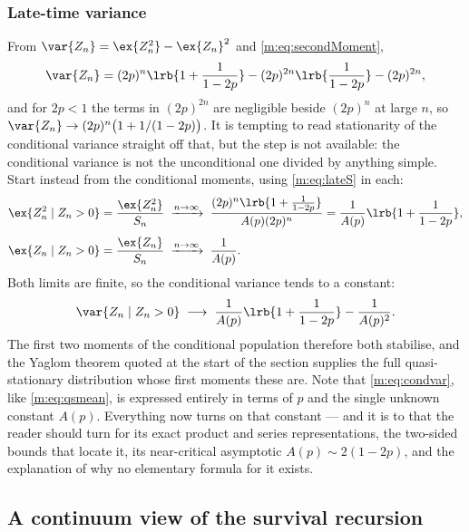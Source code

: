 \subsubsection{Late-time variance}

From $\var{Z_n} = \ex{Z_n^2}-\ex{Z_n}^2$ and \cref{m:eq:secondMoment},
\begin{equation*}
\var{Z_n} = (2p)^n\lrb{1+\frac{1}{1-2p}} - (2p)^{2n}\lrb{\frac{1}{1-2p}} - (2p)^{2n},
\end{equation*}
and for $2p<1$ the terms in $(2p)^{2n}$ are negligible beside $(2p)^n$ at large
$n$, so $\var{Z_n}\to(2p)^n\bigl(1+1/(1-2p)\bigr)$. It is tempting to read
stationarity of the conditional variance straight off that, but the step is not
available: the conditional variance is not the unconditional one divided by
anything simple. Start instead from the conditional moments, using
\cref{m:eq:lateS} in each:
\begin{align*}
\ex{Z_n^2\mid Z_n>0} &= \frac{\ex{Z_n^2}}{S_n}
\;\xrightarrow{n\to\infty}\;
\frac{(2p)^n\lrb{1+\frac{1}{1-2p}}}{A(p)(2p)^n}
= \frac{1}{A(p)}\lrb{1+\frac{1}{1-2p}},\\[4pt]
\ex{Z_n\mid Z_n>0} &= \frac{\ex{Z_n}}{S_n}
\;\xrightarrow{n\to\infty}\;
\frac{1}{A(p)} .
\end{align*}
Both limits are finite, so the conditional variance tends to a constant:
\begin{equation}
\label{m:eq:condvar}
\var{Z_n\mid Z_n>0} \;\longrightarrow\;
\frac{1}{A(p)}\lrb{1+\frac{1}{1-2p}} - \frac{1}{A(p)^2} .
\end{equation}
The first two moments of the conditional population therefore both stabilise, and
the Yaglom theorem quoted at the start of the section supplies the full
quasi-stationary distribution whose first moments these are. Note that
\cref{m:eq:condvar}, like \cref{m:eq:qsmean}, is expressed entirely in terms of $p$
and the single unknown constant $A(p)$. Everything now turns on that constant ---
and it is to \ChA{} that the reader should turn for its exact product and series
representations, the two-sided bounds that locate it, its near-critical asymptotic
$A(p)\sim2(1-2p)$, and the explanation of why no elementary formula for it exists.

\subsection{A continuum view of the survival recursion}
\label{m:sec:riccati}

